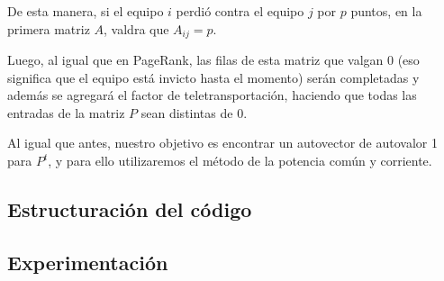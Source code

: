 De esta manera, si el equipo $i$ perdió contra el equipo $j$ por $p$ puntos, en la primera matriz $A$, valdra que $A_{ij} = p$. 

Luego, al igual que en PageRank, las filas de esta matriz que valgan 0 (eso significa que el equipo está invicto hasta el momento) serán completadas y además se agregará el factor de teletransportación, haciendo que todas las entradas de la matriz $P$ sean distintas de 0.

Al igual que antes, nuestro objetivo es encontrar un autovector de autovalor 1 para $P^t$, y para ello utilizaremos el método de la potencia común y corriente.

\subsection{Estructuración del código}

\subsection{Experimentación}

